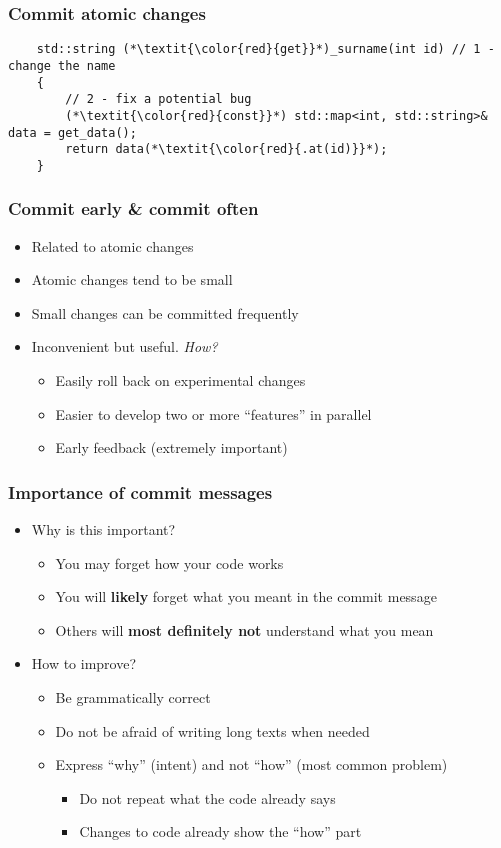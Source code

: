 \documentclass{beamer}
\begin{document}
\begin{frame}[fragile]
  \frametitle{Commit atomic changes}
   \begin{lstlisting}
    std::string (*\textit{\color{red}{get}}*)_surname(int id) // 1 - change the name
    {
        // 2 - fix a potential bug
        (*\textit{\color{red}{const}}*) std::map<int, std::string>& data = get_data();
        return data(*\textit{\color{red}{.at(id)}}*);
    }
  \end{lstlisting}
\end{frame}

\begin{frame}
  \frametitle{Commit early \& commit often}
  \begin{itemize}
  \item<1-> Related to atomic changes
  \item<2-> Atomic changes tend to be small
  \item<3-> Small changes can be committed frequently
  \item<4-> Inconvenient but useful. \textit{How?}
    \begin{itemize}
    \item<5-> Easily roll back on experimental changes
    \item<6-> Easier to develop two or more ``features'' in parallel
    \item<7-> Early feedback (extremely important)
    \end{itemize}
  \end{itemize}
\end{frame}

\begin{frame}
  \frametitle{Importance of commit messages}
  \begin{itemize}
  \item<1-> Why is this important?
    \begin{itemize}
    \item<2-> You may forget how your code works
    \item<3-> You will \textbf{likely} forget what you meant in the commit message
    \item<4-> Others will \textbf{most definitely not} understand what you mean 
    \end{itemize}
  \item<5-> How to improve?
    \begin{itemize}
    \item<6-> Be grammatically correct
    \item<7-> Do not be afraid of writing long texts when needed
    \item<8-> Express ``why'' (intent) and not ``how'' (most common problem)
      \begin{itemize}
      \item <8-> Do not repeat what the code already says
      \item <8-> Changes to code already show the ``how'' part
      \end{itemize}
    \end{itemize}
  \end{itemize}
\end{frame}
\end{document}
